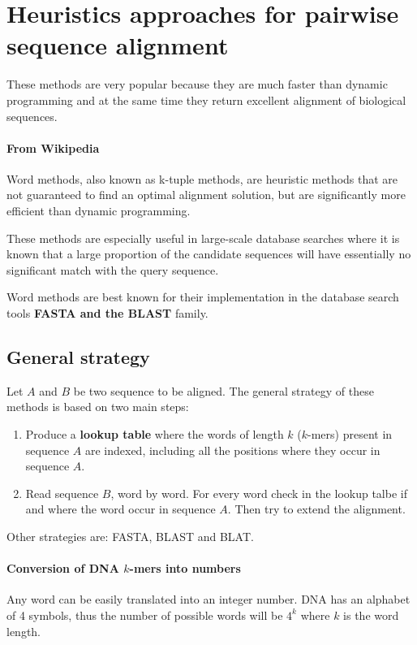 \newpage
\section{Heuristics approaches for pairwise sequence alignment}
These methods are very popular because they are much faster than dynamic
programming and at the same time they return excellent alignment of biological
sequences.

\paragraph*{From Wikipedia}
Word methods, also known as k-tuple methods, are heuristic
methods that are not guaranteed to find an optimal alignment solution,
but are  significantly more efficient than dynamic programming.

These methods are especially useful in large-scale database searches where
it is known that a large proportion of the candidate sequences will
have essentially no significant match with the query sequence.

Word methods are best known for their implementation in the database
search tools \textbf{FASTA and the BLAST} family.

\subsection{General strategy}

Let $A$ and $B$ be two sequence to be aligned. The general strategy of these
methods is based on two main steps:

\begin{enumerate}
  \item Produce a \textbf{lookup table} where the words of length $k$
($k$-mers) present in sequence $A$ are indexed, including all the positions
where they occur in sequence $A$.
  \item Read sequence $B$, word by word. For every word check in the lookup
talbe if and where the word occur in sequence $A$. Then try to extend the
alignment.
\end{enumerate}

Other strategies are: FASTA, BLAST and BLAT.

\paragraph*{Conversion of DNA $k$-mers into numbers}

Any word can be easily translated into an integer number.
DNA has an alphabet of 4 symbols, thus the number of possible words will be
$4^k$ where $k$ is the word length.

